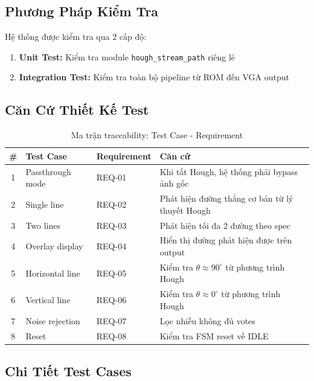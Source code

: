 \documentclass[12pt,a4paper]{article}
\begin{document}
\subsection{Phương Pháp Kiểm Tra}

Hệ thống được kiểm tra qua 2 cấp độ:

\begin{enumerate}
    \item \textbf{Unit Test:} Kiểm tra module \texttt{hough\_stream\_path} riêng lẻ
    \item \textbf{Integration Test:} Kiểm tra toàn bộ pipeline từ ROM đến VGA output
\end{enumerate}

\subsection{Căn Cứ Thiết Kế Test}

\begin{table}[H]
\centering
\caption{Ma trận traceability: Test Case - Requirement}
\label{tab:traceability}
\begin{tabular}{|c|l|l|l|}
\hline
\textbf{\#} & \textbf{Test Case} & \textbf{Requirement} & \textbf{Căn cứ} \\
\hline
1 & Passthrough mode & REQ-01 & Khi tắt Hough, hệ thống phải bypass ảnh gốc \\
\hline
2 & Single line & REQ-02 & Phát hiện đường thẳng cơ bản từ lý thuyết Hough \\
\hline
3 & Two lines & REQ-03 & Phát hiện tối đa 2 đường theo spec \\
\hline
4 & Overlay display & REQ-04 & Hiển thị đường phát hiện được trên output \\
\hline
5 & Horizontal line & REQ-05 & Kiểm tra $\theta \approx 90^\circ$ từ phương trình Hough \\
\hline
6 & Vertical line & REQ-06 & Kiểm tra $\theta \approx 0^\circ$ từ phương trình Hough \\
\hline
7 & Noise rejection & REQ-07 & Lọc nhiễu không đủ votes \\
\hline
8 & Reset & REQ-08 & Kiểm tra FSM reset về IDLE \\
\hline
\end{tabular}
\end{table}

\subsection{Chi Tiết Test Cases}
\end{document}
